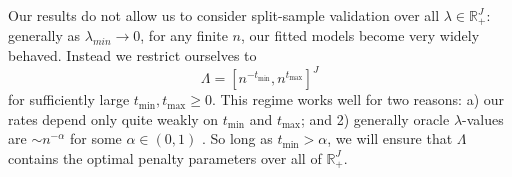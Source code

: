 \documentclass[12pt]{article}
\begin{document}
Our results do not allow us to consider split-sample validation over all $\lambda\in\mathbb{R}^J_+$: generally as $\lambda_{min} \rightarrow 0$, for any finite $n$, our fitted models become very widely behaved. Instead we restrict ourselves to 
\begin{equation}
\label{thrm:lambda_range}
\Lambda = [ n^{-t_{\min}}, n^{t_{\max}}]^J
\end{equation}
for sufficiently large $t_{\min}, t_{\max} \ge 0$. This regime works well for two reasons: a) our rates depend only quite weakly on $t_{\min}$ and $t_{\max}$; and 2) generally oracle $\lambda$-values are $\sim n^{-\alpha}$ for some $\alpha \in (0,1)$ \citep{van2000empirical, van2014additive, buhlmann2011statistics}. So long as $t_{\min} > \alpha$, we will ensure that $\Lambda$ contains the optimal penalty parameters over all of $\mathbb{R}^J_+$.
\end{document}
